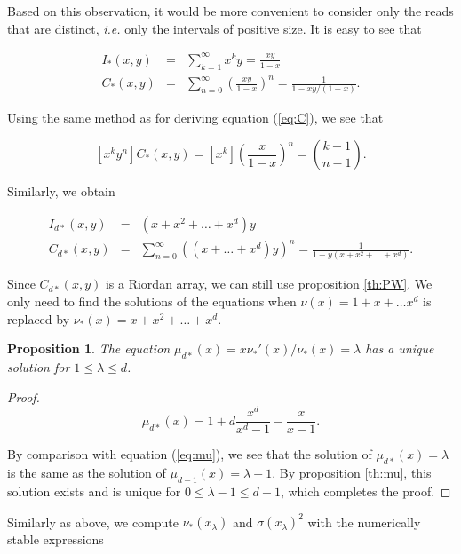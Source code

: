 \documentclass{article}
\newtheorem{proposition}{Proposition}
\begin{document}
Based on this observation, it would be more convenient to consider only
the reads that are distinct, \textit{i.e.} only the intervals of positive
size. It is easy to see that

\begin{eqnarray*}
I_*(x,y) &=& \sum_{k=1}^\infty x^ky = \frac{xy}{1-x} \\
C_*(x,y) &=& \sum_{n=0}^\infty \left( \frac{xy}{1-x} \right)^n
= \frac{1}{1-xy/(1-x)}.
\end{eqnarray*}

Using the same method as for deriving equation (\ref{eq:C}), we see that 

\begin{equation}
\label{eq:Cstar}
[x^ky^n]C_*(x,y) = [x^k] \left( \frac{x}{1-x} \right)^n
= {k-1 \choose n-1}.
\end{equation}

Similarly, we obtain 

\begin{eqnarray*}
I_{d*}(x,y) &=& (x + x^2 + \ldots + x^d)y \\
C_{d*}(x,y) &=& \sum_{n=0}^\infty \left((x+ \ldots + x^d)y
\right)^n
= \frac{1}{1-y(x+x^2+\ldots+x^d)}.
\end{eqnarray*}

Since $C_{d*}(x,y)$ is a Riordan array, we can still use proposition
\ref{th:PW}. We only need to find the solutions of the equations when
$\nu(x) = 1+ x+ \ldots x^d$ is replaced by $\nu_*(x) = x+x^2+\ldots +x^d$.

\begin{proposition}
The equation $\mu_{d*}(x) = x\nu_*'(x)/\nu_*(x) = \lambda$ has a unique
solution for $1 \leq \lambda \leq d$.
\end{proposition}

\begin{proof}
\label{th:mustar}
\begin{equation}
\label{eq:mustar}
\mu_{d*}(x) = 1 + d\frac{x^d}{x^d-1} - \frac{x}{x-1}.
\end{equation}

By comparison with equation (\ref{eq:mu}), we see that the solution of
$\mu_{d*}(x) = \lambda$ is the same as the solution of $\mu_{d-1}(x) =
\lambda - 1$. By proposition \ref{th:mu}, this solution exists and is
unique for $0 \leq \lambda -1 \leq d-1$, which completes the proof.
\end{proof}

Similarly as above, we compute $\nu_*(x_\lambda)$ and
$\sigma(x_\lambda)^2$ with the numerically stable expressions
\end{document}
